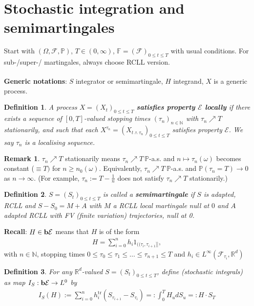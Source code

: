 \documentclass[12pt,a4paper, twoside]{article}
\newtheorem{defn}{Definition}[section]
\theoremstyle{definition}
\newtheorem{rem}{Remark}[section]
\newcommand{\PP}{\mathbb{P}} %
\newcommand{\simple}{\textbf{\text{b}}\mathcal{E}}
\begin{document}
\section{Stochastic integration and semimartingales}
Start with $( \Omega, \mathcal{F}, \PP)$, $T \in (0, \infty)$, $\mathbb{F}=(\mathcal{F})_{0 \leq t \leq T}$ with usual conditions. For sub-/super-/ martingales, always choose RCLL version. 
\\\\
\textbf{Generic notations}: $S$ integrator or semimartingale, $H$ integrand, $X$ is a generic process. 
\begin{defn} A process $X=(X_t)_{0 \leq t \leq T}$ \textbf{satisfies property $\mathcal{E}$ locally} if there exists a sequence of $[0,T]$-valued stopping times $( \tau_n)_{n \in \mathbb{N}}$ with $\tau_n \nearrow T$ stationarily, and such that each $X^{\tau_n}= (X_{t \wedge \tau_n})_{0 \leq t \leq T}$ satisfies property $\mathcal{E}$. We say $\tau_n$ is a localising sequence. 
\end{defn}
\begin{rem} $\tau_n \nearrow T$ stationarily means $\tau_n \nearrow T \ \PP$-a.s. and $n \mapsto \tau_n( \omega)$ becomes constant ($\equiv T)$ for $n \geq n_0( \omega)$. Equivalently, $\tau_n \nearrow T \ \PP$-a.s. and $\PP( \tau_n=T) \to 0$ as $n \to \infty$. (For example, $\tau_n := T- \frac{1}{n}$ does not satisfy $\tau_n \nearrow T$ stationarily.) 
\end{rem}
\begin{defn} $S=(S_t)_{0 \leq t \leq T}$ is called a \textbf{semimartingale} if $S$ is adapted, RCLL and $S-S_0=M+A$ with $M$ a RCLL local martingale null at $0$ and $A$ adapted RCLL with FV (finite variation) trajectories, null at 0. 
\end{defn}
\textbf{Recall}: $H \in \simple$ means that $H$ is of the form 
\begin{align*}
H = \sum_{i=0}^n h_i 1_{(\!( \tau_i, \tau_{i+1} ]\!]},
\end{align*}
with $n \in \mathbb{N}$,  stopping times $0 \leq \tau_0 \leq \tau_1 \leq \dots \leq \tau_{n+1} \leq T$ and $h_i \in L^\infty ( \mathcal{F}_{\tau_i}, \mathbb{R}^d)$
\begin{defn} For any $\mathbb{R}^d$-valued $S= (S_t)_{0 \leq t \leq T}$, define (stochastic integrals) as map $I_S: \simple \to L^0$ by
\begin{align*}
I_S(H):= \sum_{i=0}^n h_i^\text{tr} (S_{\tau_{i+1}}-S_{\tau_i}) =: \int_0^T H_u dS_u =: H \cdot S_T
\end{align*} 
\end{defn}
\end{document}

